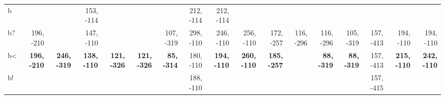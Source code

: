 \begin{table}[p]
{\begin{tabular}{lrrrrrrrrrrrrrrrr}
b &  &  & 153, -114 &  &  &  & 212, -114 & 212, -114 &  &  &  &  &  &  &  &  \\
b? & 196, -210 &  & 147, -110 &  &  & 107, -319 & 298, -110 & 246, -110 & 256, -110 & 172, -257 & 116, -296 & 116, -296 & 105, -319 & 157, -413 & 194, -110 & 194, -110 \\
b< & \textbf{196, -210} & \textbf{246, -319} & \textbf{138, -110} & \textbf{121, -326} & \textbf{121, -326} & \textbf{85, -314} & 180, -110 & \textbf{194, -110} & \textbf{260, -110} & \textbf{185, -257} &  & \textbf{88, -319} & \textbf{88, -319} & 157, -413 & \textbf{215, -110} & \textbf{242, -110} \\
b! &  &  &  &  &  &  & 188, -110 &  &  &  &  &  &  & 157, -415 &  &  \\

\end{tabular}
}
\end{table}
\clearpage
